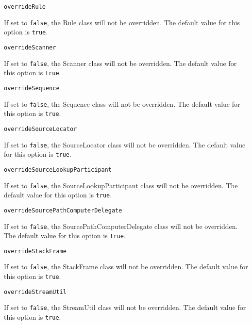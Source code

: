\noindent\texttt{overrideRule}
\begin{myindentpar}{1cm}
If set to \texttt{false}, the Rule class will not be overridden. The default value for this option is \texttt{true}.
\end{myindentpar}

\noindent\texttt{overrideScanner}
\begin{myindentpar}{1cm}
If set to \texttt{false}, the Scanner class will not be overridden. The default value for this option is \texttt{true}.
\end{myindentpar}

\noindent\texttt{overrideSequence}
\begin{myindentpar}{1cm}
If set to \texttt{false}, the Sequence class will not be overridden. The default value for this option is \texttt{true}.
\end{myindentpar}

\noindent\texttt{overrideSourceLocator}
\begin{myindentpar}{1cm}
If set to \texttt{false}, the SourceLocator class will not be overridden. The default value for this option is \texttt{true}.
\end{myindentpar}

\noindent\texttt{overrideSourceLookupParticipant}
\begin{myindentpar}{1cm}
If set to \texttt{false}, the SourceLookupParticipant class will not be overridden. The default value for this option is \texttt{true}.
\end{myindentpar}

\noindent\texttt{overrideSourcePathComputerDelegate}
\begin{myindentpar}{1cm}
If set to \texttt{false}, the SourcePathComputerDelegate class will not be overridden. The default value for this option is \texttt{true}.
\end{myindentpar}

\noindent\texttt{overrideStackFrame}
\begin{myindentpar}{1cm}
If set to \texttt{false}, the StackFrame class will not be overridden. The default value for this option is \texttt{true}.
\end{myindentpar}

\noindent\texttt{overrideStreamUtil}
\begin{myindentpar}{1cm}
If set to \texttt{false}, the StreamUtil class will not be overridden. The default value for this option is \texttt{true}.
\end{myindentpar}

